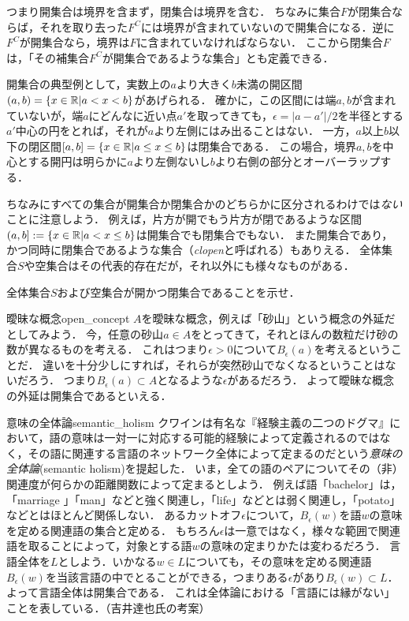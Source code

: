 \documentclass[11pt,a4paper, dvipdfmx]{jsarticle}
\begin{document}
つまり開集合は境界を含まず，閉集合は境界を含む．
ちなみに集合$F$が閉集合ならば，それを取り去った$F^C$には境界が含まれていないので開集合になる．逆に$F^C$が開集合なら，境界は$F$に含まれていなければならない．
ここから閉集合$F$は，「その補集合$F^C$が開集合であるような集合」とも定義できる．

開集合の典型例として，実数上の$a$より大きく$b$未満の開区間$(a, b) = \{x \in \mathbb{R}| a < x < b\}$があげられる．
確かに，この区間には端$a, b$が含まれていないが，端$a$にどんなに近い点$a'$を取ってきても，$\epsilon=|a-a'|/2$を半径とする$a'$中心の円をとれば，それが$a$より左側にはみ出ることはない．
一方，$a$以上$b$以下の閉区間$[a, b] = \{x \in \mathbb{R}| a \leq  x \leq  b\}$は閉集合である．
この場合，境界$a, b$を中心とする開円は明らかに$a$より左側ないし$b$より右側の部分とオーバーラップする．

ちなみにすべての集合が開集合か閉集合かのどちらかに区分されるわけでは\emph{ない}ことに注意しよう．
例えば，片方が開でもう片方が閉であるような区間$(a, b] := \{ x \in \mathbb{R}| a < x \leq b \}$は開集合でも閉集合でもない．
また開集合であり，かつ同時に閉集合であるような集合（\emph{clopen}と呼ばれる）もありえる．
全体集合$S$や空集合はその代表的存在だが，それ以外にも様々なものがある．

\begin{renshu}{}{}
  全体集合$S$および空集合が開かつ閉集合であることを示せ．
\end{renshu}


\begin{rei}{曖昧な概念}{open_concept}
  $A$を曖昧な概念，例えば「砂山」という概念の外延だとしてみよう．
  今，任意の砂山$a \in A$をとってきて，それとほんの数粒だけ砂の数が異なるものを考える．
  これはつまり$\epsilon > 0$について$B_\epsilon(a)$を考えるということだ．
  違いを十分少しにすれば，それらが突然砂山でなくなるということはないだろう．
  つまり$B_\epsilon(a) \subset A$となるような$\epsilon$があるだろう．
  よって曖昧な概念の外延は開集合であるといえる．
\end{rei}


\begin{rei}{意味の全体論}{semantic_holism}
クワインは有名な『経験主義の二つのドグマ』において，語の意味は一対一に対応する可能的経験によって定義されるのではなく，その語に関連する言語のネットワーク全体によって定まるのだという\emph{意味の全体論}(semantic holism)を提起した．
いま，全ての語のペアについてその（非）関連度が何らかの距離関数によって定まるとしよう．
例えば語「bachelor」は，「marriage 」「man」などと強く関連し，「life」などとは弱く関連し，「potato」などとはほとんど関係しない．
あるカットオフ$\epsilon$について，$B_\epsilon(w)$を語$w$の意味を定める関連語の集合と定める．
もちろん$\epsilon$は一意ではなく，様々な範囲で関連語を取ることによって，対象とする語$w$の意味の定まりかたは変わるだろう．
言語全体を$L$としよう．いかなる$w \in L$についても，その意味を定める関連語$B_\epsilon(w)$を当該言語の中でとることができる，つまりある$\epsilon$があり$B_\epsilon(w) \subset L$．
よって言語全体は開集合である．
これは全体論における「言語には縁がない」ことを表している．（吉井達也氏の考案）
\end{rei}
\end{document}
